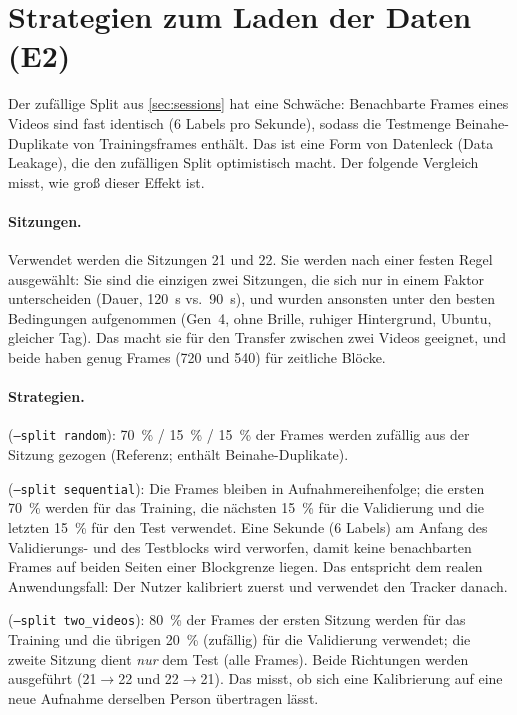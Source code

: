 \documentclass[
  11pt,
  a4paper,
  oneside,
  DIV=12,
  BCOR=8mm,
  parskip=half,
  headings=normal,
  bibliography=totoc,
  listof=totoc
]{scrreprt}
\newcommand{\code}[1]{\texttt{#1}}
\begin{document}
\section{Strategien zum Laden der Daten (E2)}
\label{sec:loading}

Der zufällige Split aus \cref{sec:sessions} hat eine Schwäche: Benachbarte
Frames eines Videos sind fast identisch (6 Labels pro Sekunde), sodass die
Testmenge Beinahe-Duplikate von Trainingsframes enthält. Das ist eine Form
von Datenleck (Data Leakage), die den zufälligen Split optimistisch macht.
Der folgende Vergleich misst, wie groß dieser Effekt ist.

\paragraph{Sitzungen.} Verwendet werden die Sitzungen 21 und 22. Sie werden
nach einer festen Regel ausgewählt: Sie sind die einzigen zwei Sitzungen, die
sich nur in einem Faktor unterscheiden (Dauer, \SI{120}{\second} vs.\
\SI{90}{\second}), und wurden ansonsten unter den besten Bedingungen
aufgenommen (Gen~4, ohne Brille, ruhiger Hintergrund, Ubuntu, gleicher Tag).
Das macht sie für den Transfer zwischen zwei Videos geeignet, und beide haben
genug Frames (720 und 540) für zeitliche Blöcke.

\paragraph{Strategien.}
\begin{description}[nosep]
  \item[Zufällige Auswahl] (\code{--split random}): \SI{70}{\percent} /
        \SI{15}{\percent} / \SI{15}{\percent} der Frames werden zufällig aus
        der Sitzung gezogen (Referenz; enthält Beinahe-Duplikate).
  \item[Sequenzielle Auswahl] (\code{--split sequential}): Die Frames bleiben
        in Aufnahmereihenfolge; die ersten \SI{70}{\percent} werden für das
        Training, die nächsten \SI{15}{\percent} für die Validierung und die
        letzten \SI{15}{\percent} für den Test verwendet. Eine Sekunde (6
        Labels) am Anfang des Validierungs- und des Testblocks wird verworfen,
        damit keine benachbarten Frames auf beiden Seiten einer Blockgrenze
        liegen. Das entspricht dem realen Anwendungsfall: Der Nutzer
        kalibriert zuerst und verwendet den Tracker danach.
  \item[Training mit zwei Videos] (\code{--split two\_videos}):
        \SI{80}{\percent} der Frames der ersten Sitzung werden für das
        Training und die übrigen \SI{20}{\percent} (zufällig) für die
        Validierung verwendet; die zweite Sitzung dient \emph{nur} dem Test
        (alle Frames). Beide Richtungen werden ausgeführt (21$\to$22 und
        22$\to$21). Das misst, ob sich eine Kalibrierung auf eine neue
        Aufnahme derselben Person übertragen lässt.
\end{description}
\end{document}
